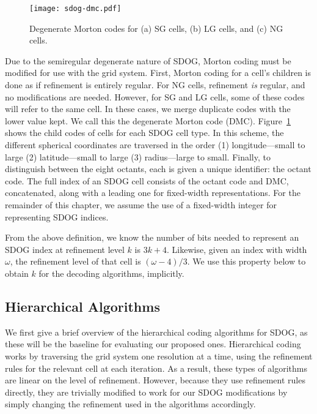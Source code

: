 \begin{figure}[ht!]
	\centering
	\texttt{[image: sdog-dmc.pdf]}
	\caption[Degenerate Morton codes for the different SDOG cell types]{
		Degenerate Morton codes for (a) SG cells, (b) LG cells, and (c) NG cells.
	}
	\label{fig:sdog-dmc}
\end{figure}


Due to the semiregular degenerate nature of SDOG, Morton coding must be modified for use with the grid system.
First, Morton coding for a cell's children is done as if refinement is entirely regular.
For NG cells, refinement \textit{is} regular, and no modifications are needed.
However, for SG and LG cells, some of these codes will refer to the same cell.
In these cases, we merge duplicate codes with the lower value kept.
We call this the degenerate Morton code (DMC).
Figure~\ref{fig:sdog-dmc} shows the child codes of cells for each SDOG cell type.
In this scheme, the different spherical coordinates are traversed in the order (1) longitude---small to large (2) latitude---small to large (3) radius---large to small.
Finally, to distinguish between the eight octants, each is given a unique identifier: the octant code.
The full index of an SDOG cell consists of the octant code and DMC, concatenated, along with a leading one for fixed-width representations.
For the remainder of this chapter, we assume the use of a fixed-width integer for representing SDOG indices.


From the above definition, we know the number of bits needed to represent an SDOG index at refinement level $k$ is $3k + 4$.
Likewise, given an index with width $\omega$, the refinement level of that cell is $(\omega - 4) / 3$.
We use this property below to obtain $k$ for the decoding algorithms, implicitly.


\subsection{Hierarchical Algorithms}
We first give a brief overview of the hierarchical coding algorithms for SDOG, as these will be the baseline for evaluating our proposed ones.
Hierarchical coding works by traversing the grid system one resolution at a time, using the refinement rules for the relevant cell at each iteration.
As a result, these types of algorithms are linear on the level of refinement.
However, because they use refinement rules directly, they are trivially modified to work for our SDOG modifications by simply changing the refinement used in the algorithms accordingly.


